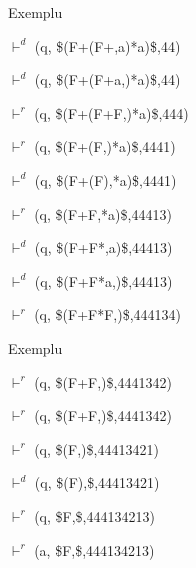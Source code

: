 \documentclass[pdf]{beamer}
\begin{document}
\begin{frame}{Exemplu}

$\vdash^{d}$ (q, \$(F+(F+,a)*a)\$,44)
\newline

$\vdash^{d}$ (q, \$(F+(F+a,)*a)\$,44)
\newline

$\vdash^{r}$ (q, \$(F+(F+F,)*a)\$,444)
\newline

$\vdash^{r}$ (q, \$(F+(F,)*a)\$,4441)
\newline

$\vdash^{d}$ (q, \$(F+(F),*a)\$,4441)
\newline

$\vdash^{r}$ (q, \$(F+F,*a)\$,44413)
\newline

$\vdash^{d}$ (q, \$(F+F*,a)\$,44413)
\newline

$\vdash^{d}$ (q, \$(F+F*a,)\$,44413)
\newline

$\vdash^{r}$ (q, \$(F+F*F,)\$,444134)
\newline

\end{frame}



\begin{frame}{Exemplu}

$\vdash^{r}$ (q, \$(F+F,)\$,4441342)
\newline

$\vdash^{r}$ (q, \$(F+F,)\$,4441342)
\newline

$\vdash^{r}$ (q, \$(F,)\$,44413421)
\newline

$\vdash^{d}$ (q, \$(F),\$,44413421)
\newline

$\vdash^{r}$ (q, \$F,\$,444134213)
\newline

$\vdash^{r}$ (a, \$F,\$,444134213)


\end{frame}
\end{document}
